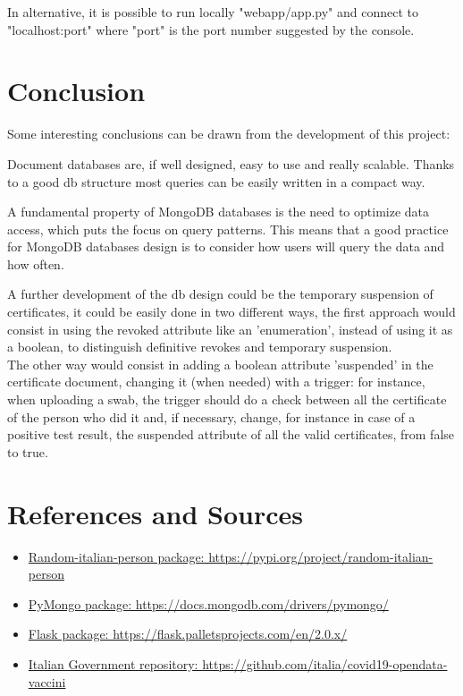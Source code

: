 \documentclass{article}
\begin{document}
In alternative, it is possible to run locally {\selectfont"webapp/app.py"} and connect to {\selectfont"localhost:port"} where {\selectfont"port"} is the port number suggested by the console.

\section{Conclusion}

Some interesting conclusions can be drawn from the development of this project:

Document databases are, if well designed, easy to use and really scalable. Thanks to a good db structure most queries can be easily written in a compact way.

A fundamental property of MongoDB databases is the need to optimize data access, which puts the focus on query patterns. This means that a good practice for MongoDB databases design is to consider how users will query the data and how often.

A further development of the db design could be the temporary suspension of certificates, it could be easily done in two different ways, the first approach would consist in using the revoked attribute like an 'enumeration', instead of using it as a boolean, to distinguish definitive revokes and temporary suspension.
\\The other way would consist in adding a boolean attribute 'suspended' in the certificate document, changing it (when needed) with a trigger: for instance, when uploading a swab, the trigger should do a check between all the certificate of the person who did it and, if necessary, change, for instance in case of a positive test result, the suspended attribute of all the valid certificates, from false to true.

\section{References and Sources}
\begin{itemize}
    \item \url{Random-italian-person package: https://pypi.org/project/random-italian-person}
    \item \url{PyMongo package: https://docs.mongodb.com/drivers/pymongo/}
    \item \url{Flask package: https://flask.palletsprojects.com/en/2.0.x/}
    \item \url{Italian Government repository: https://github.com/italia/covid19-opendata-vaccini}
\end{itemize}
\end{document}
